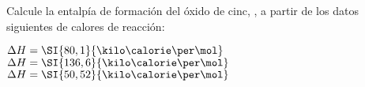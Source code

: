 Calcule la entalpía de formación del óxido de cinc, , a partir de los datos siguientes de calores de reacción:\\[.3cm]
    \begin{center}
        \quad\quad$\Delta H=\SI{80,1}{\kilo\calorie\per\mol}$\\
        \quad\quad\quad\quad\quad$\Delta H=\SI{136,6}{\kilo\calorie\per\mol}$\\
        \quad\quad$\Delta H=\SI{50,52}{\kilo\calorie\per\mol}$
    \end{center}
